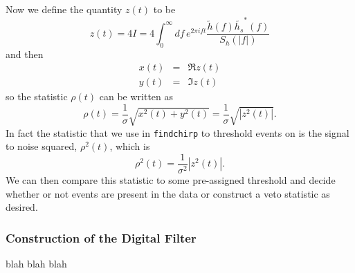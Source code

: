 Now we define the quantity $z(t)$ to be
\begin{equation}
z(t) = 4 I = 4 \int_{0}^{\infty} df\, e^{2\pi i f t}\frac{\tilde{h}(f)
\tilde{h_s}^\ast(f)}{S_h\left(\left|f\right|\right)}
\end{equation}
and then
\begin{eqnarray}
x(t) &=& \Re z(t) \\
y(t) &=& \Im z(t)
\end{eqnarray}
so the statistic $\rho(t)$ can be written as
\begin{equation}
\rho(t) = \frac{1}{\sigma} \sqrt{x^2(t) + y^2(t)} 
= \frac{1}{\sigma} \sqrt{|z^2(t)|}.
\end{equation}
In fact the statistic that we use in \texttt{findchirp} to threshold events on
is the signal to noise squared, $\rho^2 (t)$, which is
\begin{equation}
\rho^2(t) = \frac{1}{\sigma^2} \left|z^2(t)\right|.
\end{equation}
We can then compare this statistic to some pre-assigned threshold and decide
whether or not events are present in the data or construct a veto statistic
as desired.

\subsubsection*{Construction of the Digital Filter}
 blah blah blah
